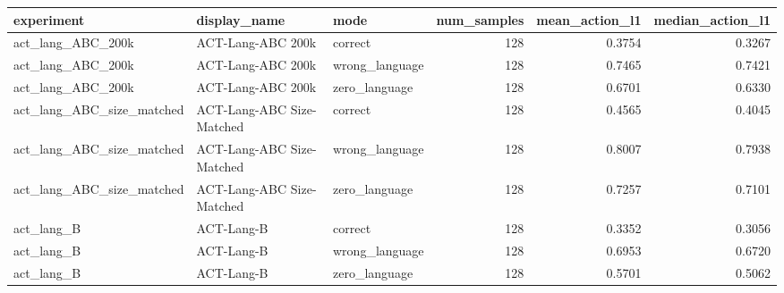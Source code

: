 \begin{tabular}{lllrrr}
\toprule
experiment & display\_name & mode & num\_samples & mean\_action\_l1 & median\_action\_l1 \\
\midrule
act\_lang\_ABC\_200k & ACT-Lang-ABC 200k & correct & 128 & 0.3754 & 0.3267 \\
act\_lang\_ABC\_200k & ACT-Lang-ABC 200k & wrong\_language & 128 & 0.7465 & 0.7421 \\
act\_lang\_ABC\_200k & ACT-Lang-ABC 200k & zero\_language & 128 & 0.6701 & 0.6330 \\
act\_lang\_ABC\_size\_matched & ACT-Lang-ABC Size-Matched & correct & 128 & 0.4565 & 0.4045 \\
act\_lang\_ABC\_size\_matched & ACT-Lang-ABC Size-Matched & wrong\_language & 128 & 0.8007 & 0.7938 \\
act\_lang\_ABC\_size\_matched & ACT-Lang-ABC Size-Matched & zero\_language & 128 & 0.7257 & 0.7101 \\
act\_lang\_B & ACT-Lang-B & correct & 128 & 0.3352 & 0.3056 \\
act\_lang\_B & ACT-Lang-B & wrong\_language & 128 & 0.6953 & 0.6720 \\
act\_lang\_B & ACT-Lang-B & zero\_language & 128 & 0.5701 & 0.5062 \\
\bottomrule
\end{tabular}
